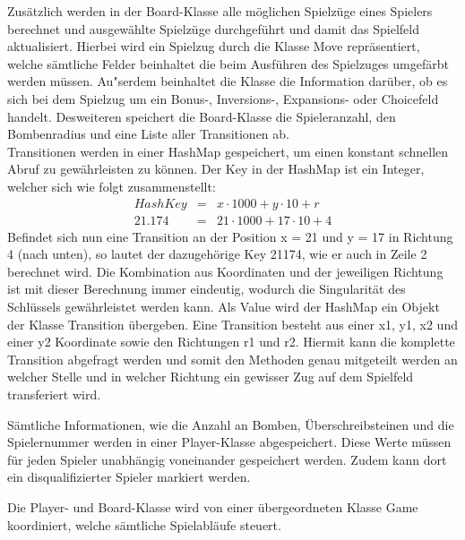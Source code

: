 Zus\"atzlich werden in der Board-Klasse alle m\"oglichen Spielz\"uge eines Spielers berechnet und ausgew\"ahlte Spielz\"uge durchgef\"uhrt und damit das Spielfeld aktualisiert.
Hierbei wird ein Spielzug durch die Klasse Move repr\"asentiert, welche s\"amtliche Felder beinhaltet die beim Ausf\"uhren des Spielzuges umgef\"arbt werden m\"ussen.
Au"serdem beinhaltet die Klasse die Information dar\"uber, ob es sich bei dem Spielzug um ein Bonus-, Inversions-, Expansions- oder Choicefeld handelt.
Desweiteren speichert die Board-Klasse die Spieleranzahl, den Bombenradius und eine Liste aller Transitionen ab. \\
Transitionen werden in einer HashMap gespeichert, um einen konstant schnellen Abruf zu gew\"ahrleisten zu k\"onnen.
Der Key in der HashMap ist ein Integer, welcher sich wie folgt zusammenstellt:
\begin{align}
    HashKey &=& x \cdot 1000 + y \cdot 10 + r \\
    21.174 &=& 21 \cdot 1000 + 17 \cdot 10 + 4
\end{align}
Befindet sich nun eine Transition an der Position x = 21 und y = 17 in Richtung 4 (nach unten), so lautet der dazugeh\"orige Key 21174, wie er auch in Zeile 2 berechnet wird.
Die Kombination aus Koordinaten und der jeweiligen Richtung ist mit dieser Berechnung immer eindeutig, wodurch die Singularit\"at des Schl\"ussels gew\"ahrleistet werden kann.
Als Value wird der HashMap ein Objekt der Klasse Transition \"ubergeben.
Eine Transition besteht aus einer x1, y1, x2 und einer y2 Koordinate sowie den Richtungen r1 und r2.
Hiermit kann die komplette Transition abgefragt werden und somit den Methoden genau mitgeteilt werden an welcher Stelle und in welcher Richtung ein gewisser Zug auf dem Spielfeld transferiert wird.

S\"amtliche Informationen, wie die Anzahl an Bomben, \"Uberschreibsteinen und die Spielernummer werden in einer Player-Klasse abgespeichert.
Diese Werte m\"ussen f\"ur jeden Spieler unabh\"angig voneinander gespeichert werden.
Zudem kann dort ein disqualifizierter Spieler markiert werden.

Die Player- und Board-Klasse wird von einer \"ubergeordneten Klasse Game koordiniert, welche s\"amtliche Spielabl\"aufe steuert.


\bigskip
\newpage